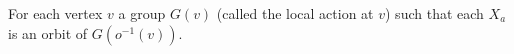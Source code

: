 \documentclass[preview]{standalone}
\begin{document}
\begin{center}
For each vertex $v$ a group $G(v)$ (called the local action at $v$) such that each $X_a$ is an orbit of $G(o^{-1}(v))$.
\end{center}
\end{document}
